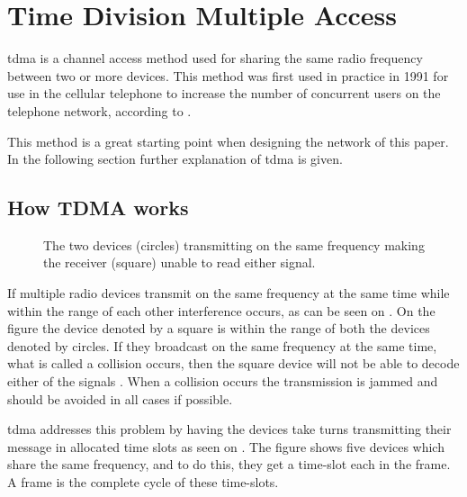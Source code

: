 \chapter{Time Division Multiple Access}\label{TDMA}

\gls{tdma} is a channel access method used for sharing the same radio frequency between two or more devices.
This method was first used in practice in 1991 for use in the cellular telephone to increase the number of concurrent users on the telephone network, according to \citet{networkencyclopedia2013time}.

This method is a great starting point when designing the network of this paper.
In the following section further explanation of \gls{tdma} is given.

\section{How TDMA works}

\begin{SCfigure}
    \vspace{-10pt}
    \centering
    \footnotesize
    \resizebox{0.5\linewidth}{!}{%
}
    \caption{The two devices (circles) transmitting on the same frequency making the receiver (square) unable to read either signal.}
    \label{fig:rangediagram}
    \vspace{-10pt}    
\end{SCfigure}

If multiple radio devices transmit on the same frequency at the same time while within the range of each other interference occurs, as can be seen on . 
On the figure the device denoted by a square is within the range of both the devices denoted by circles. 
If they broadcast on the same frequency at the same time, what is called a collision occurs, then the square device will not be able to decode either of the signals \cite{networkencyclopedia2013time, networkencyclopedia2013advanced}.
When a collision occurs the transmission is jammed and should be avoided in all cases if possible.

\gls{tdma} addresses this problem by having the devices take turns transmitting their message in allocated time slots as seen on .
The figure shows five devices which share the same frequency, and to do this, they get a time-slot each in the frame.
A frame is the complete cycle of these time-slots.

